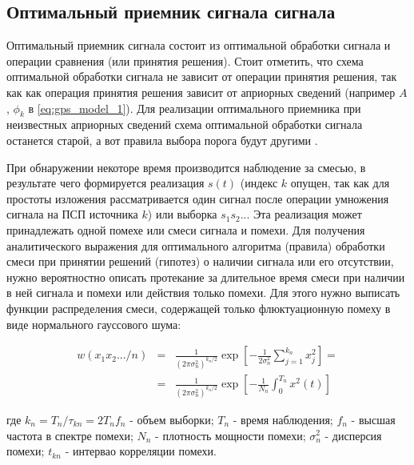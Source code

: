 \subsection{Оптимальный приемник сигнала сигнала}

Оптимальный приемник сигнала состоит из оптимальной обработки сигнала и операции сравнения (или принятия решения). Стоит отметить,
что схема оптимальной обработки сигнала не зависит от операции принятия решения, так как как операция принятия решения зависит от
априорных сведений (например $A$, $\phi_k$ в \ref{eq:gps_model_1}). Для реализации оптимального приемника при неизвестных априорных
сведений схема оптимальной обработки сигнала останется старой, а вот правила выбора порога будут другими \cite{pestryakov-book}.

При обнаружении некоторе время производится наблюдение за смесью, в результате чего формируется реализация $s(t)$ (индекс $k$
опущен, так как для простоты изложения рассматривается один сигнал после операции умножения сигнала на ПСП источника $k$) или
выборка $s_{1}s_{2}...$ Эта реализация может принадлежать одной помехе или смеси сигнала и помехи. Для получения аналитического
выражения для оптимального алгоритма (правила) обработки смеси при принятии решений (гипотез) о наличии сигнала или его отсутствии,
нужно вероятностно описать протекание за длительное время смеси при наличии в ней сигнала и помехи или действия только помехи. Для
этого нужно выписать функции распределения смеси, содержащей только флюктуационную помеху в виде нормального гауссового шума:

\begin{center}
\begin{eqnarray}
	\label{eq:just_noise}
	w(x_{1}x_{2}.../n) & = & \frac{1}{(2\pi\sigma_{n}^{2})^{k_n/2}}\exp[-\frac{1}{2\sigma_{n}^{2}}\sum_{j=1}^{k_n}x_{j}^2] = \\
			& = & \frac{1}{(2\pi\sigma_{n}^{2})^{k_n/2}}\exp[-\frac{1}{N_n}\int_{0}^{T_n}x^2(t)] \nonumber
\end{eqnarray}
\end{center}
где $k_n=T_n/\tau_{kn}=2T_nf_{n}$ - объем выборки; ${T_n}$ - время наблюдения; ${f_{n}}$ - высшая частота в спектре помехи;
${N_n}$ - плотность мощности помехи; ${\sigma_{n}^{2}}$ - дисперсия помехи; ${t_{kn}}$ - интервао корреляции помехи.

